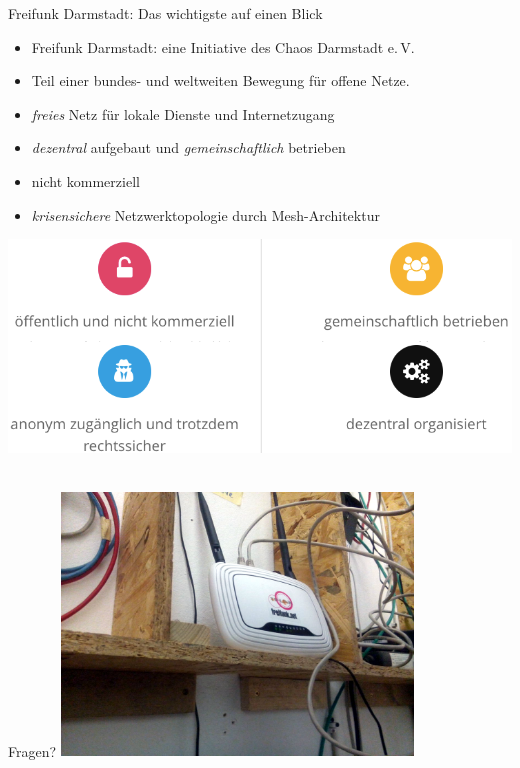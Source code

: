 \documentclass[10pt]{beamer}
\begin{document}
    \begin{frame}{Freifunk Darmstadt: Das wichtigste auf einen Blick}
      \begin{centering}
      \begin{itemize}
        \item Freifunk Darmstadt: eine Initiative des Chaos Darmstadt e.\,V.
        \item Teil einer bundes- und weltweiten Bewegung für offene Netze.
        \item \emph{freies} Netz für lokale Dienste und Internetzugang
        \item \emph{dezentral} aufgebaut und \emph{gemeinschaftlich} betrieben
        \item nicht kommerziell
        \item \emph{krisensichere} Netzwerktopologie durch Mesh-Architektur
      \end{itemize}
      \includegraphics[width=1.0\textheight]{images/principles}$\;$
      \end{centering}
    \end{frame}

    \begin{frame}{Fragen?}
      \vfill
      \centering
      \includegraphics[width=0.7\textwidth]{images/irl_router}
      \vfill
    \end{frame}
\end{document}
